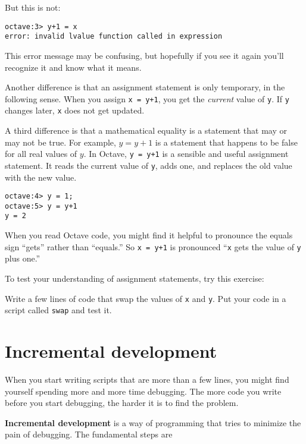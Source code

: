 But this is not:

\begin{verbatim}
octave:3> y+1 = x
error: invalid lvalue function called in expression
\end{verbatim}

This error message may be confusing, but hopefully if you see it again you'll
recognize it and know what it means.

Another difference is that an assignment statement is only temporary,
in the following sense. When you assign {\tt x = y+1}, you get the
{\em current} value of {\tt y}. If {\tt y} changes later, {\tt x}
does not get updated.

A third difference is that a mathematical equality is a statement that
may or may not be true. For example, $y = y+1$ is a statement that
happens to be false for all real values of $y$. In Octave, {\tt y
= y+1} is a sensible and useful assignment statement. It reads the
current value of {\tt y}, adds one, and replaces the old value with
the new value.

\begin{verbatim}
octave:4> y = 1;
octave:5> y = y+1
y = 2
\end{verbatim}

When you read Octave code, you might find it helpful to pronounce
the equals sign ``gets'' rather than ``equals.'' So {\tt x = y+1}
is pronounced ``{\tt x} gets the value of {\tt y} plus one.''

To test your understanding of assignment statements, try this
exercise:

\begin{ex}
Write a few lines of code that swap the values of
{\tt x} and {\tt y}. Put your code in a script called {\tt swap}
and test it.
\end{ex}

\section{Incremental development}

When you start writing scripts that are more than a few lines, you
might find yourself spending more and more time debugging. The more
code you write before you start debugging, the harder it is to find
the problem.

{\bf Incremental development} is a way of programming that tries
to minimize the pain of debugging. The fundamental steps are

